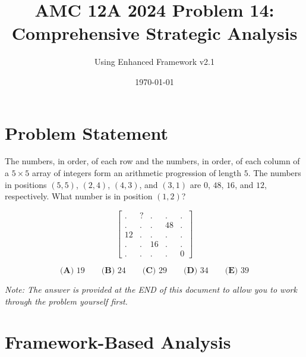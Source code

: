 \documentclass[12pt]{article}
\title{\textbf{AMC 12A 2024 Problem 14:\\Comprehensive Strategic Analysis}}
\author{Using Enhanced Framework v2.1}
\date{\today}
\begin{document}
\maketitle

\section*{Problem Statement}

The numbers, in order, of each row and the numbers, in order, of each column of a $5 \times 5$ array of integers form an arithmetic progression of length $5$. The numbers in positions $(5, 5)$, $(2,4)$, $(4,3)$, and $(3, 1)$ are $0$, $48$, $16$, and $12$, respectively. What number is in position $(1, 2)$?

\[\begin{bmatrix} . & ? &.&.&. \\ .&.&.&48&.\\ 12&.&.&.&.\\ .&.&16&.&.\\ .&.&.&.&0\end{bmatrix}\]

$$\textbf{(A) } 19 \qquad \textbf{(B) } 24 \qquad \textbf{(C) } 29 \qquad \textbf{(D) } 34 \qquad \textbf{(E) } 39$$

\vspace{1em}
\noindent\textit{Note: The answer is provided at the END of this document to allow you to work through the problem yourself first.}

\section*{Framework-Based Analysis}
\end{document}
